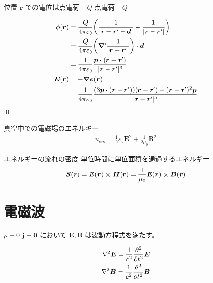\documentclass[uplatex,dvipdfmx,a4paper,11pt]{jlreq}
\makeatletter
\newcommand{\EE}{\bm{E}}
\newcommand{\BB}{\bm{B}}
\newcommand{\rr}{\bm{r}}
\newcommand{\pp}{\bm{p}}
\theoremstyle{definition}
\renewenvironment{proof}[1][\proofname]{\par
  \normalfont
  \topsep6\p@\@plus6\p@ \trivlist
  \item[\hskip\labelsep{\bfseries #1}\@addpunct{\bfseries}]\ignorespaces\quad\par
}{%
  \qed\endtrivlist\@endpefalse
}
\renewcommand\proofname{証明}
\makeatother
\begin{document}
\begin{proposition}[電気双極子]
  位置 $\rr$ での電位は点電荷 $-Q$ 点電荷 $+Q$
\end{proposition}
\begin{proof}
  \begin{align}
    \phi(\rr) & = \frac{Q}{4\pi\varepsilon_0}\qty(\frac{1}{|\rr - \rr' - \bm{d}|} - \frac{1}{|\rr - \rr'|})                     \\
              & = \frac{Q}{4\pi\varepsilon_0}\qty(\vnabla'\frac{1}{|\rr - \rr'|})\vdot\bm{d}                                    \\
              & = \frac{1}{4\pi\varepsilon_0}\frac{\pp\vdot(\rr - \rr')}{|\rr - \rr'|^3}                                        \\
    \EE(\rr)  & = -\vnabla\phi(\rr)                                                                                             \\
              & = \frac{1}{4\pi\varepsilon_0}\frac{\qty(3\pp\vdot(\rr - \rr'))(\rr - \rr') - (\rr - \rr')^2\pp}{|\rr - \rr'|^5}
  \end{align}
\end{proof}

\begin{proposition}[極座標で表した電気双極子]
\end{proposition}

\begin{theorem}
  真空中での電磁場のエネルギー
  \begin{align}
    u_{em} = \frac{1}{2}\varepsilon_0\EE^2 + \frac{1}{2\mu_0}\BB^2
  \end{align}
\end{theorem}

\begin{definition}
  エネルギーの流れの密度
  単位時間に単位面積を通過するエネルギー
  \begin{align}
    \bm{S}(\rr) = \EE(\rr)\cross\bm{H}(\rr) = \frac{1}{\mu_0}\EE(\rr)\cross\BB(\rr)
  \end{align}
\end{definition}

\newcommand{\Et}{\tilde{E}}
\newcommand{\ET}{\tilde{\bm{E}}}
\newcommand{\Ec}{\mathcal{E}}
\newcommand{\EC}{\vb*{\mathcal{E}}}
\newcommand{\LL}{\bm{L}}
\newcommand{\ee}{\bm{\epsilon}}
\renewcommand{\SS}{\bm{S}}
\newcommand{\JJ}{\bm{J}}
\section{電磁波}
\begin{proposition}
  $\rho = 0$ $\bm{j} = \bm{0}$ において $\EE, \BB$ は波動方程式を満たす。
\end{proposition}
\begin{align}
  \nabla^2\EE = \frac{1}{c^2}\pdv[2]{t}\EE \\
  \nabla^2\BB = \frac{1}{c^2}\pdv[2]{t}\BB
\end{align}
\end{document}
